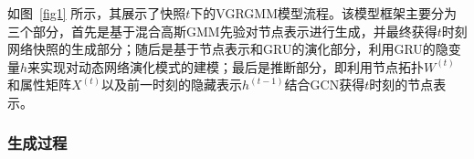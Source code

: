如图~\ref{fig1} 所示，其展示了快照$t$下的VGRGMM模型流程。该模型框架主要分为三个部分，首先是基于混合高斯GMM先验对节点表示进行生成，并最终获得$t$时刻网络快照的生成部分；随后是基于节点表示和GRU的演化部分，利用GRU的隐变量$h$来实现对动态网络演化模式的建模；最后是推断部分，即利用节点拓扑$W^{(t)}$和属性矩阵$X^{(t)}$以及前一时刻的隐藏表示$h^{(t-1)}$结合GCN获得$t$时刻的节点表示。




\subsubsection{生成过程}


